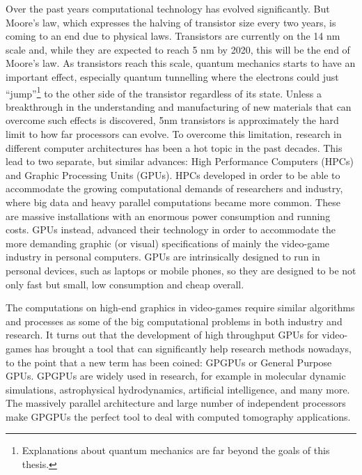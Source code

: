 Over the past years computational technology has evolved significantly. But Moore's law, which expresses the halving of transistor size every two years, is coming to an end due to physical laws. Transistors  are currently on the 14 nm scale and, while they are expected to reach 5 nm by 2020, this will be the end of Moore's law. As transistors reach this scale, quantum mechanics starts to have an important effect, especially quantum tunnelling where the electrons could just ``jump''\footnote{Explanations about quantum mechanics are far beyond the goals of this thesis.} to the other side of the transistor regardless of its state. Unless a breakthrough in the understanding and manufacturing of new materials that can overcome such effects is discovered, 5nm transistors is approximately the hard limit to how far processors can evolve. To overcome this limitation, research in different computer architectures has been a hot topic in the past decades. This lead to two separate, but similar advances: High Performance Computers (HPCs) and Graphic Processing Units (GPUs). HPCs developed in order to be able to accommodate the growing computational demands of researchers and industry, where big data and heavy parallel computations became more common. These are massive installations with an enormous power consumption and running costs. GPUs instead, advanced their technology in order to accommodate the more demanding graphic (or visual) specifications of mainly the video-game industry in personal computers. GPUs are intrinsically designed to run in personal devices, such as laptops or mobile phones, so they are designed to be not only fast but small, low consumption and cheap overall.

The computations on high-end graphics in video-games require similar algorithms and processes as some of the big computational problems in both industry and research. It turns out that the development of high throughput GPUs for video-games has brought a tool that can significantly help research methods nowadays, to the point that a new term has been coined: GPGPUs or General Purpose GPUs. GPGPUs are widely used in research, for example in molecular dynamic simulations\cite{phillips2005scalable}, astrophysical hydrodynamics\cite{CHOLLA}, artificial intelligence\cite{Tensorflow}, and many more. The massively parallel architecture and large number of independent processors make GPGPUs the perfect tool to deal with computed tomography applications.

